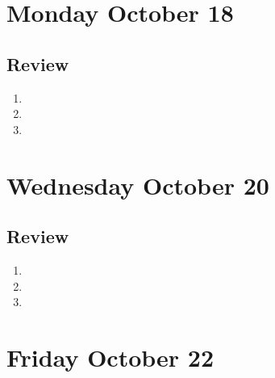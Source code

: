 

\section*{Monday October 18}

\newpage



\newpage

\newpage
\subsection*{Review}
\begin{enumerate}
\item 
\item 
\item 
\end{enumerate}

\newpage
\section*{Wednesday October 20}


\vfill


\newpage



\newpage
\subsection*{Review}
\begin{enumerate}
\item 
\item 
\item 
\end{enumerate}

\newpage
\section*{Friday October 22}




\newpage


\newpage
